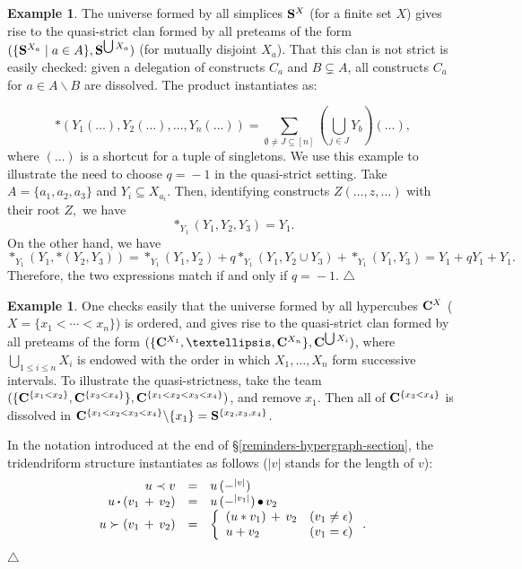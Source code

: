 \documentclass[11pt]{article}
\theoremstyle{definition}
\newtheorem{example}[theo]{Example}
\numberwithin{equation}{section}
\numberwithin{equation}{section}
\newcommand\xqed[1]{%
  \leavevmode\unskip\penalty9999 \hbox{}\nobreak\hfill
  \quad\hbox{#1}}
\newcommand\demo{\xqed{$\triangle$}}
\newcommand{\inc}{\subseteq}
\newcommand{\set}[1]{\{#1\}}
\newcommand{\setc}[2]{\set{#1 \mid #2}}
\newcommand{\Union}{\bigcup}		%
\newcommand{\hyper}[1]{{\bf #1}}
\newcommand{\bcdot}{\,{\bm \cdot}\,}
\newcommand{\contribution}[2]{#1_{\upharpoonright #2}}
\newcommand{\incs}{\subsetneq}
\newcommand{\pbullet}{\mbox{{\scriptsize $\bullet$}}}
\begin{document}
\begin{example} \label{illustration-q-1}
The universe formed by all simplices $\hyper{S}^X$ (for a  finite set $X$) gives rise to the quasi-strict clan formed by all preteams of the form 
$(\setc{\hyper{S}^{X_a}}{a\in A},\hyper{S}^{\Union X_a})$ (for mutually disjoint $X_a$).  That this clan is not strict is easily checked: given a delegation of constructs $C_a$ and $B\incs A$, all constructs $C_a$ for $a\in A\backslash B$ are dissolved.
The   product instantiates as:

$$
\ast(Y_1(\ldots), Y_2(\ldots), \ldots, Y_n(\ldots)) = \sum_{\emptyset \neq J \subseteq [n]} (\bigcup_{j \in J} Y_b)(\ldots),
$$
where $(\ldots)$ is a shortcut for a tuple of singletons.
We use this example to illustrate the need to choose $q\!=\!-1$ in the quasi-strict setting.
Take $A=\set{a_1,a_2,a_3}$ and $Y_i\inc X_{a_i}$. Then, identifying constructs $Z(\ldots,z,\ldots)$ with their root $Z,$ we have
$$\ast_{Y_1}(Y_1,Y_2,Y_3)= Y_1.$$ 
On the other hand, we have  
$$\ast_{Y_1}(Y_1,\ast(Y_2,Y_3))
 = \ast_{Y_1}(Y_1,Y_2)+ q \ast_{Y_1}(Y_1,Y_2\cup Y_3) + \ast_{Y_1}(Y_1,Y_3)
=  Y_1 +qY_1 +Y_1.$$
Therefore, the two expressions match if and only if $q\!=\!-1$. \demo
\end{example}
\begin{example} \label{hypercube2-example}
 One checks easily that the universe formed by all   hypercubes $\hyper{C}^X$ ($X=\set{x_1<\cdots<x_n}$)  is ordered, and gives rise to the  quasi-strict clan formed by all preteams of the form 
$(\{\hyper{C}^{X_1},\ldots,\hyper{C}^{X_n}\},\hyper{C}^{\Union X_i})$, where $\Union_{1\leq i\leq n} X_i$ is endowed with the  order in which  $X_1,\ldots,X_n$ form successive intervals. To illustrate the quasi-strictness, take the team $(\{\hyper{C}^{\set{x_1<x_2}},\hyper{C}^{\set{x_3<x_4}}\},\hyper{C}^{\set{x_1<x_2<x_3<x_4}})$, and remove $x_1$. Then all of  $\hyper{C}^{\set{x_3<x_4}}$ is dissolved in 
$\hyper{C}^{\set{x_1<x_2<x_3<x_4}}\backslash\set{x_1}=\hyper{S}^{\set{x_2,x_3,x_4}}$.

In the notation introduced at the end of \S\ref{reminders-hypergraph-section}, the tridendriform structure instantiates  as follows ($|v|$ stands for the length of $v$):
$$\begin{array}{rcl}
u \prec v &=& u \,(-^{|v|}) \\
u \bcdot (v_1 \, +\,  v_2) &=& u\, (-^{|v_1|})\,\pbullet\, v_2\\
u \succ (v_1 \,+ \, v_2) &=& \left\{\begin{array}{ll} (u \ast v_1) \,+ \,v_2 & (v_1\neq\epsilon)\\
u+v_2 & (v_1=\epsilon)
\end{array}\right. .
\end{array}$$ \demo
\end{example} 
\end{document}
